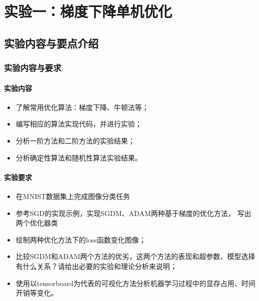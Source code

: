 \chapter{实验一：梯度下降单机优化}\label{chapter:task1}

\section{实验内容与要点介绍}

\subsection{实验内容与要求}

\subsubsection{实验内容}
\begin{itemize}
    \item 了解常用优化算法：梯度下降、牛顿法等；
    \item 编写相应的算法实现代码，并进行实验；
    \item 分析一阶方法和二阶方法的实验结果；
    \item 分析确定性算法和随机性算法实验结果。
\end{itemize}

\subsubsection{实验要求}
\begin{itemize}
    \item 在MNIST数据集上完成图像分类任务
    \item 参考SGD的实现示例，实现SGDM、ADAM两种基于梯度的优化方法， 写出两个优化器类
    \item 绘制两种优化方法下的loss函数变化图像；
    \item 比较SGDM和ADAM两个方法的优劣，这两个方法的表现和超参数、模型选择有什么关系？请给出必要的实验和理论分析来说明；
    \item 使用以tensorboard为代表的可视化方法分析机器学习过程中的显存占用、时间开销等变化。
\end{itemize}

